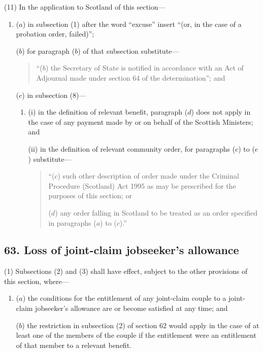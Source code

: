 \documentclass[12pt,a4paper]{article}
\begin{document}
(11) In the application to Scotland of this section—
\begin{enumerate}\item[]
($a$) in subsection (1)  after the word “excuse” insert “(or, in the case of a probation order, failed)”;

($b$) for paragraph ($b$)  of that subsection substitute—
\begin{quotation}
“($b$) the Secretary of State is notified in accordance with an Act of Adjournal made under section 64 of the determination”; and
\end{quotation}

($c$) in subsection (8)—
\begin{enumerate}\item[]
(i) in the definition of relevant benefit, paragraph ($d$)  does not apply in the case of any payment made by or on behalf of the Scottish Ministers; and

(ii) in the definition of relevant community order, for paragraphs ($c$)  to ($e$)  substitute—
\begin{quotation}
“($c$) such other description of order made under the Criminal Procedure (Scotland) Act 1995 as may be prescribed for the purposes of this section; or

($d$) any order falling in Scotland to be treated as an order specified in paragraphs ($a$)  to ($c$).”
\end{quotation}
\end{enumerate}
\end{enumerate}


\subsection{63. Loss of joint-claim jobseeker’s allowance}

(1) Subsections (2)  and (3)  shall have effect, subject to the other provisions of this section, where—
\begin{enumerate}\item[]
($a$) the conditions for the entitlement of any joint-claim couple to a joint-claim jobseeker’s allowance are or become satisfied at any time; and

($b$) the restriction in subsection (2)  of section 62 would apply in the case of at least one of the members of the couple if the entitlement were an entitlement of that member to a relevant benefit.
\end{enumerate}
\end{document}
